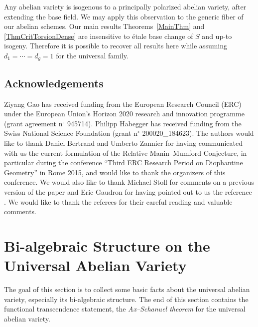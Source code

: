 \documentclass[12pt,oneside]{amsart}
\numberwithin{maincounter}{section}
\numberwithin{equation}{section}
\def\ZZ{\mathbb{Z}}
\def\QQ{\mathbb{Q}}
\newcommand{\cal}{\mathcal}
\newcommand{\cA}{\cal{A}}
\newcommand{\IQbar}{{\overline{\QQ}}}
\newcommand{\IZ}{{\ZZ}}
\begin{document}
Any abelian variety is isogenous to a principally polarized abelian
variety, after extending the base field. We may apply this observation
to the generic fiber of our abelian schemes. Our main results
Theorems~\ref{MainThm} and \ref{ThmCritTorsionDense} are insensitive
to \'etale base change of $S$ and up-to isogeny. Therefore it is
possible to recover all results here while assuming $d_1=\cdots=d_g=1$
for the universal family.




\subsection*{Acknowledgements} Ziyang Gao has received
funding from the European Research Council (ERC) under the
European Union's Horizon 2020 research and innovation programme (grant
agreement n$^\circ$ 945714). Philipp Habegger has received funding
from the Swiss National Science Foundation (grant n$^\circ$ 200020\_184623). 
The authors would like to thank Daniel Bertrand and Umberto Zannier for having communicated with us the current formulation of the Relative Manin--Mumford Conjecture, in particular during the conference ``Third ERC Research Period on Diophantine Geometry'' in Rome 2015, and would like to thank the organizers of this conference. We would also like to thank Michael Stoll for comments on a previous version of the paper and Eric Gaudron for having pointed out to us the reference \cite{RemondGaloisBound}. We would like to thank the referees for their careful reading and valuable comments.



\section{Bi-algebraic Structure on the Universal Abelian Variety}
\label{SectionBiAlg}
The goal of this section is to collect some basic facts about the universal abelian variety, especially its bi-algebraic structure. The end of this section contains the functional transcendence statement, the \textit{Ax--Schanuel theorem} for the universal abelian variety.
\end{document}

